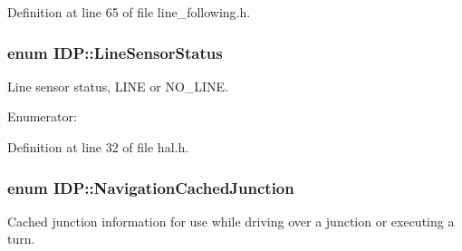 Definition at line 65 of file line\_\-following.h.

\hypertarget{namespaceIDP_afc3b1d4cbb313bfc854f49d6f23b25f7}{
\subsubsection[{LineSensorStatus}]{\setlength{\rightskip}{0pt plus 5cm}enum {\bf IDP::LineSensorStatus}}}
\label{namespaceIDP_afc3b1d4cbb313bfc854f49d6f23b25f7}


Line sensor status, LINE or NO\_\-LINE. 

\begin{Desc}
\item[Enumerator: ]\par
\begin{description}
\item[{\em 
\hypertarget{namespaceIDP_afc3b1d4cbb313bfc854f49d6f23b25f7ab8f6b528c0b2fd3edfdd6463cc6a2fd2}{
LINE}
\label{namespaceIDP_afc3b1d4cbb313bfc854f49d6f23b25f7ab8f6b528c0b2fd3edfdd6463cc6a2fd2}
}]\item[{\em 
\hypertarget{namespaceIDP_afc3b1d4cbb313bfc854f49d6f23b25f7a8f85d4834fc4519df3f2053201d497d1}{
NO\_\-LINE}
\label{namespaceIDP_afc3b1d4cbb313bfc854f49d6f23b25f7a8f85d4834fc4519df3f2053201d497d1}
}]\end{description}
\end{Desc}



Definition at line 32 of file hal.h.

\hypertarget{namespaceIDP_a628dde0214c4c861deda405e77ad75a2}{
\subsubsection[{NavigationCachedJunction}]{\setlength{\rightskip}{0pt plus 5cm}enum {\bf IDP::NavigationCachedJunction}}}
\label{namespaceIDP_a628dde0214c4c861deda405e77ad75a2}


Cached junction information for use while driving over a junction or executing a turn. 

